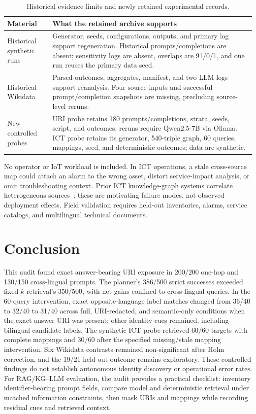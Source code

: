 \documentclass[a4paper,fleqn]{cas-dc}
\begin{document}
\begin{table}[t]
\centering\scriptsize
\begin{tabular}{p{2.55cm}p{12.15cm}}
\toprule
Material & What the retained archive supports \\
\midrule
Historical synthetic runs & Generator, seeds, configurations, outputs, and primary log support regeneration. Historical prompts/completions are absent; sensitivity logs are absent, overlaps are 91/0/1, and one run reuses the primary data seed. \\
Historical Wikidata & Parsed outcomes, aggregates, manifest, and two LLM logs support reanalysis. Four source inputs and successful prompt/completion snapshots are missing, precluding source-level reruns. \\
New controlled probes & URI probe retains 180 prompts/completions, strata, seeds, script, and outcomes; reruns require Qwen2.5-7B via Ollama. ICT probe retains its generator, 540-triple graph, 60 queries, mappings, seed, and deterministic outcomes; data are synthetic. \\
\bottomrule
\end{tabular}
\caption{Historical evidence limits and newly retained experimental records.}
\label{tab:availability}
\end{table}

No operator or IoT workload is included. In ICT operations, a stale cross-source map could attach an alarm to the wrong asset, distort service-impact analysis, or omit troubleshooting context. Prior ICT knowledge-graph systems correlate heterogeneous sources~\cite{xie2021iotkg,tailhardat2024noriaui}; these are motivating failure modes, not observed deployment effects. Field validation requires held-out inventories, alarms, service catalogs, and multilingual technical documents.

\section{Conclusion}\label{sec:conclusion}
This audit found exact answer-bearing URI exposure in 200/200 one-hop and 130/150 cross-lingual prompts. The planner's 386/500 strict successes exceeded fixed-$k$ retrieval's 350/500, with net gains confined to cross-lingual queries. In the 60-query intervention, exact opposite-language label matches changed from 36/40 to 32/40 to 31/40 across full, URI-redacted, and semantic-only conditions when the exact answer URI was present; other identity cues remained, including bilingual candidate labels. The synthetic ICT probe retrieved 60/60 targets with complete mappings and 30/60 after the specified missing/stale mapping intervention. Six Wikidata contrasts remained non-significant after Holm correction, and the 19/21 held-out outcome remains exploratory. These controlled findings do not establish autonomous identity discovery or operational error rates. For RAG/KG--LLM evaluation, the audit provides a practical checklist: inventory identifier-bearing prompt fields, compare model and deterministic retrieval under matched information constraints, then mask URIs and mappings while recording residual cues and retrieved context.
\end{document}
